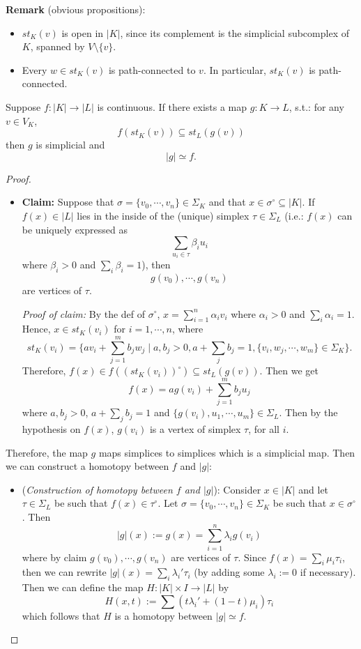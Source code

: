 \noindent\textbf{Remark} (obvious propositions):
\begin{itemize}
    \item $st_K(v)$ is open in $|K|$, since its complement is the simplicial subcomplex of $K$, spanned by $V \setminus \{v\}$.
    \item Every $w \in st_K(v)$ is path-connected to $v$. In particular, $st_K(v)$ is path-connected.
\end{itemize}

\begin{proposition}
    Suppose $f : |K| \rightarrow |L|$ is continuous. If there exists a map $g: K \rightarrow L$, s.t.: for any $v \in V_K$,
    $$f(st_K(v)) \subseteq st_L (g(v))$$
    then $g$ is simplicial and $$|g| \simeq f.$$
\end{proposition}

\begin{proof}
    \begin{itemize}
        \item \textbf{Claim:} Suppose that $\sigma = \{ v_0, \cdots ,v_n\} \in \Sigma_K$ and that $x \in \sigma^\circ \subseteq |K|$. If $f(x) \in |L|$ lies in the inside of the (unique) simplex $\tau \in \Sigma_L$ (i.e.: $f(x)$ can be uniquely expressed as
        $$\sum_{u_i \in \tau} \beta_i u_i$$
        where $\beta_i >0$ and $\sum_{i} \beta_i =1$), then
        $$g(v_0),\cdots,g(v_n)$$
        are vertices of $\tau$.

        \textit{Proof of claim:} By the def of $\sigma^\circ$,
        $x = \sum_{i=1}^n \alpha_i v_i$
        where $\alpha_i >0$ and $\sum_i \alpha_i = 1$. Hence, $x \in st_K(v_i)$ for $i=1,\cdots,n$, where
        $$st_K(v_i) = \{av_i + \sum_{j=1}^m b_jw_j \mid a,b_j>0 ,a+\sum_jb_j =1, \{v_i,w_j,\cdots,w_m \} \in \Sigma_K\}.$$
        Therefore, $f(x) \in f((st_K(v_i))^\circ ) \subseteq st_L(g(v))$. Then we get
        $$f(x) = ag(v_i) + \sum_{j=1}^m b_ju_j$$
        where $a,b_j >0$, $a+\sum_jb_j =1$ and $\{ g(v_i) ,u_1,\cdots,u_m \} \in \Sigma_L$. Then by the hypothesis on $f(x)$, $g(v_i)$ is a vertex of simplex $\tau$, for all $i$. 
    \end{itemize}
    Therefore, the map $g$ maps simplices to simplices which is a simplicial map. Then we can construct a homotopy between $f$ and $|g|$:
    \begin{itemize}
        \item (\textit{Construction of homotopy between $f$ and $|g|$}): Consider $x \in |K|$ and let $\tau \in \Sigma_L$ be such that $f(x) \in \tau^\circ$. Let $\sigma = \{ v_0 ,\cdots, v_n\} \in \Sigma_K$ be such that $x \in \sigma^\circ$. Then
        $$|g| (x) := g(x) = \sum_{i=1}^n \lambda_i g(v_i)$$
        where by claim $g(v_0) ,\cdots, g(v_n)$ are vertices of $\tau$. Since $f(x) = \sum_i \mu_i \tau_i$, then we can rewrite $|g| (x) = \sum_i \lambda_i' \tau_i$ (by adding some $\lambda_i := 0$ if necessary). Then we can define the map $H : |K| \times I \rightarrow |L|$ by
        $$H(x,t) := \sum (t\lambda_i' + (1-t)\mu_i) \tau_i$$
        which follows that $H$ is a homotopy between $|g| \simeq f$.
    \end{itemize}
\end{proof}

